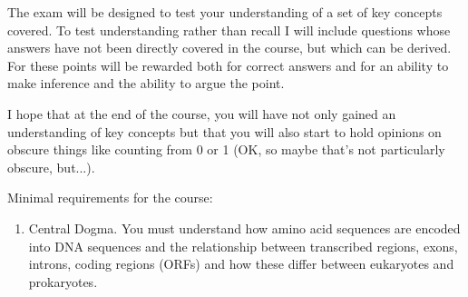 \documentclass{article}
\begin{document}
The exam will be designed to test your understanding of a set of key concepts
covered. To test understanding rather than recall I will include questions whose
answers have not been directly covered in the course, but which can be derived.
For these points will be rewarded both for correct answers and
for an ability to make inference and the ability to argue the point.

I hope that at the end of the course, you will have not only gained an understanding
of key concepts but that you will also start to hold opinions on obscure
things like counting from 0 or 1 (OK, so maybe that's not particularly obscure, but...). 

Minimal requirements for the course:
\begin{enumerate}
\item Central Dogma. You must understand how amino acid sequences are encoded
  into DNA sequences and the relationship between transcribed regions, exons,
  introns, coding regions (ORFs) and how these differ between eukaryotes and
  prokaryotes.
\end{enumerate}
\end{document}
